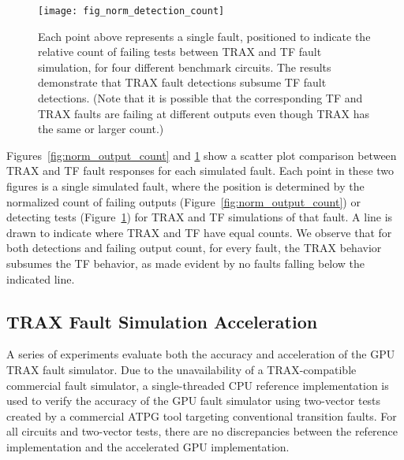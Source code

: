 \begin{figure}[hbtp]
\centering
\texttt{[image: fig\_norm\_detection\_count]}
\caption[Each point above represents a single fault, positioned to indicate the relative count of failing tests between TRAX and TF fault simulation, for four different benchmark circuits.
%
The results demonstrate that TRAX fault detections subsume TF fault detections.]{Each point above represents a single fault, positioned to indicate the relative count of failing tests between TRAX and TF fault simulation, for four different benchmark circuits.
%
The results demonstrate that TRAX fault detections subsume TF fault detections.
%
(Note that it is possible that the corresponding TF and TRAX faults are failing at different outputs even though TRAX has the same or larger count.)}
\label{fig:norm_detection_count}
\end{figure}

Figures~\ref{fig:norm_output_count} and \ref{fig:norm_detection_count} show a scatter plot comparison between TRAX and TF fault responses for each simulated fault.
%
Each point in these two figures is a single simulated fault, where the position is determined by the normalized count of failing outputs (Figure~\ref{fig:norm_output_count}) or detecting tests (Figure~\ref{fig:norm_detection_count}) for TRAX and TF simulations of that fault.
%
A line is drawn to indicate where TRAX and TF have equal counts.
%
We observe that for both detections and failing output count, for every fault, the TRAX behavior subsumes the TF behavior, as made evident by no faults falling below the indicated line.

\subsection{TRAX Fault Simulation Acceleration}
\label{sec:trax_exp_gpu}

A series of experiments evaluate both the accuracy and acceleration of the GPU TRAX fault simulator.
%
Due to the unavailability of a TRAX-compatible commercial fault simulator, a single-threaded CPU reference implementation is used to verify the accuracy of the GPU fault simulator using two-vector tests created by a commercial ATPG tool targeting conventional transition faults.
%
For all circuits and two-vector tests, there are no discrepancies between the reference implementation and the accelerated GPU implementation.

